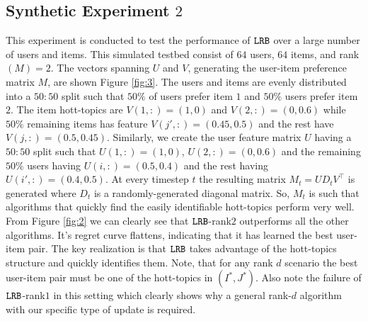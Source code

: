 \subsection{Synthetic Experiment $2$}
This experiment is conducted to test the performance of ${\tt LRB}$ over a large number of users and items. This simulated testbed consist of $64$ users, $64$ items, and rank$(M) = 2$. The vectors spanning $U$ and $V$, generating the user-item preference matrix $M$, are shown Figure \ref{fig:3}. The users and items are evenly distributed into a $50:50$ split such that $50\%$ of users prefer item $1$ and $50\%$ users prefer item $2$. The item hott-topics are $V(1,:) = (1,0)$ and $V(2,:) = (0, 0.6)$ while $50\%$ remaining  items has feature $V(j',:) = (0.45, 0.5)$ and the rest have $V(j,:) = (0.5, 0.45)$. Similarly, we create the user feature matrix $U$ having a $50:50$ split such that $U(1,:) = (1,0)$, $U(2,:) = (0,0.6)$ and the remaining $50\%$ users having $U(i,:) = (0.5,0.4)$ and the rest having $U(i',:) = (0.4,0.5)$. At every timestep $t$ the resulting matrix $M_t =UD_tV^{\intercal}$ is generated where $D_t$ is a randomly-generated diagonal matrix. So, $M_t$ is such that algorithms that quickly find the easily identifiable hott-topics perform very well. From Figure \ref{fig:2} we can clearly see that ${\tt LRB}$-rank$2$ outperforms all the other algorithms. It's  regret curve flattens, indicating that it has learned the best user-item pair. The key realization is that ${\tt LRB}$ takes advantage of the hott-topics structure and quickly identifies them. Note, that for any rank $d$ scenario the best user-item pair must be one of the hott-topics in $(I^*, J^*)$. Also note the failure of ${\tt LRB}$-rank$1$ in this setting which clearly shows why a general rank-$d$ algorithm with our specific type of update is required. 



